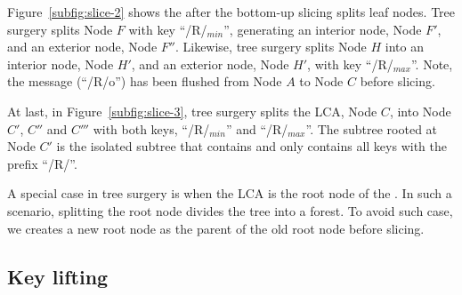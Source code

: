 Figure~\ref{subfig:slice-2} shows the \bet after the bottom-up slicing splits
leaf nodes.
Tree surgery splits Node $F$ with key ``/R/$_{min}$'', generating an interior
node, Node $F'$, and an exterior node, Node $F''$.
Likewise, tree surgery splits Node $H$ into an interior node, Node $H'$, and
an exterior node, Node $H'$, with key ``/R/$_{max}$''.
Note, the message \delm(``/R/o'') has been flushed from Node $A$ to Node $C$
before slicing.

At last, in Figure~\ref{subfig:slice-3}, tree surgery splits the LCA, Node $C$,
into Node $C'$, $C''$ and $C'''$ with both keys, ``/R/$_{min}$'' and
``/R/$_{max}$''.
The subtree rooted at Node $C'$ is the isolated subtree that contains and
only contains all keys with the prefix ``/R/''.

A special case in tree surgery is when the LCA is the root node of the \bet.
In such a scenario, splitting the root node divides the tree into a forest.
To avoid such case, we creates a new root node as the parent of the old root
node before slicing.

\subsection{Key lifting}
\label{sec:rr:lift}

